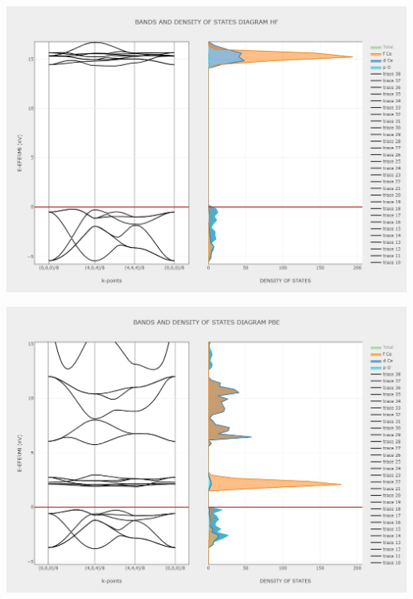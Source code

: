 \documentclass{article}
\begin{document}
\noindent\begin{minipage}{0.45\textwidth}
	\centering
	\includegraphics[width=1\textwidth]{../images/correct_band_and_dos/BAND AND DOSS HF.jpeg}
    \label{fig:BANDDOS_HF}
\end{minipage}
\hfill
\begin{minipage}{0.45\textwidth}
	\centering
	\includegraphics[width=1\textwidth]{../images/correct_band_and_dos/BAND AND DOSS PBE.jpeg}
    \label{fig:BANDDOS_PBE}
\end{minipage}
\end{document}
